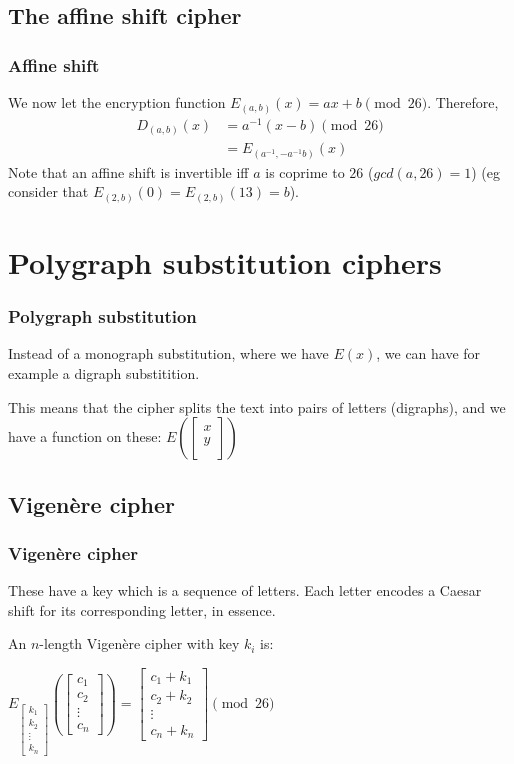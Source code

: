 \documentclass{beamer}
\begin{document}
\subsection{The affine shift cipher}

\begin{frame}
\frametitle{Affine shift}

We now let the encryption function $E_{(a, b)}(x) = ax + b \pmod{26}$. Therefore,
\begin{align*}
D_{(a, b)}(x) &= a^{-1}(x - b) \pmod{26} \\
              &= E_{(a^{-1}, -a^{-1}b)}(x)
\end{align*}
Note that an affine shift is invertible iff $a$ is coprime to $26$
($gcd(a, 26) = 1$)
(eg consider that $E_{(2, b)}(0) = E_{(2, b)}(13) = b$).

\end{frame}

\section{Polygraph substitution ciphers}

\begin{frame}
\frametitle{Polygraph substitution}
Instead of a monograph substitution, where we have
$E(x)$, we can have for example a digraph substitition.

This means that the cipher splits the text into pairs of letters (digraphs), and
we have a function on these:
$E\left(\begin{bmatrix} x \\ y \\\end{bmatrix}\right)$
\end{frame}

\subsection{Vigen\`ere cipher}

\begin{frame}
\frametitle{Vigen\`ere cipher}

These have a key which is a sequence of letters. Each letter encodes a Caesar
shift for its corresponding letter, in essence.

An $n$-length Vigen\`ere cipher with key $k_i$ is:

$  E_{\begin{bmatrix} k_1 \\ k_2 \\ \vdots \\ k_n \end{bmatrix}}
\left(\begin{bmatrix} c_1 \\ c_2 \\ \vdots \\ c_n \end{bmatrix}\right)
   =  \begin{bmatrix}c_1 + k_1 \\ c_2 + k_2 \\ \vdots \\ c_n + k_n\end{bmatrix}
   \pmod{26}$
\end{frame}
\end{document}
